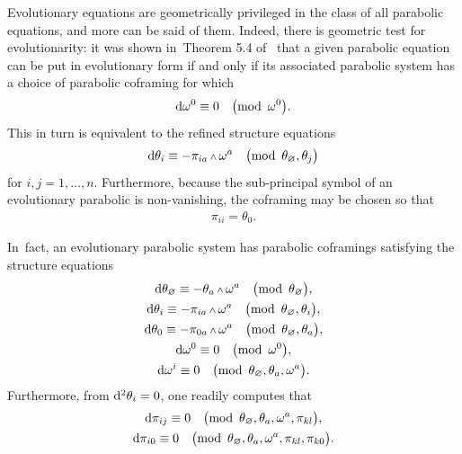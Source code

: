 \documentclass[10pt,a4paper]{amsart}
\renewcommand{\d}{{\rm d}}
\renewcommand{\mod}[1]{\quad\big(\mathrm{mod\enspace} #1\big)}
\newcommand{\w}{{\mathchoice{\,{\scriptstyle\wedge}\,}{{\scriptstyle\wedge}}
 {{\scriptscriptstyle\wedge}}{{\scriptscriptstyle\wedge}}}}
\newcommand{\thetas}[1]{\theta_{#1}}
\newcommand{\pis}[1]{\pi_{#1}}
\numberwithin{equation}{section}
\begin{document}
Evolutionary equations are geometrically privileged in the class of all parabolic equations, and more can be said of them.
Indeed, there is geometric test for evolutionarity: it was shown in~Theorem 5.4 of~\cite{McMillan:ParabolicsI} that
a given parabolic equation can be put in evolutionary form if and only if its associated parabolic system has a choice of parabolic coframing for which
\begin{gather*}
\d \omega^0 \equiv 0 \mod{\omega^0} .
\end{gather*}
This in turn is equivalent to the refined structure equations
\begin{gather}\label{eq:refined evolutionary structure equations}
 \d\thetas{i} \equiv -\pis{ia}\w\omega^a \mod{ \thetas{\varnothing},\thetas{j} }
\end{gather}
for $i, j = 1 , \dots , n$.
Furthermore, because the sub-principal symbol of an evolutionary parabolic is non-vanishing, the coframing may be chosen so that
\begin{gather}\label{eq:evolutionary parabolic sub-principal symbol}
 \pis{ii} = \thetas{0} .
\end{gather}

In~fact, an evolutionary parabolic system has parabolic coframings satisfying the structure equations
\begin{gather*}%
 \d\thetas{\varnothing} \equiv - \thetas{a}\w\omega^a \mod{\thetas{\varnothing} }, \\
 \d\thetas{i} \equiv - \pis{ia}\w\omega^a \mod{ \thetas{\varnothing}, \thetas{i} }, \\
 \d\thetas{0} \equiv - \pis{0a}\w\omega^a \mod{ \thetas{\varnothing}, \thetas{a} }, \\
 \d\omega^0 \equiv 0 \mod{\omega^0 }, \\
 \d\omega^i \equiv 0 \mod{\thetas{\varnothing}, \thetas{a}, \omega^a } .
\end{gather*}
Furthermore, from $\d^2 \thetas{i} = 0$, one readily computes that
\begin{gather*}%
 \d\pis{ij} \equiv 0 \mod{ \thetas{\varnothing}, \thetas{a}, \omega^a, \pis{kl} },
 \\
 \d\pis{i0} \equiv 0 \mod{ \thetas{\varnothing}, \thetas{a}, \omega^a, \pis{kl}, \pis{k0} } .
\end{gather*}
\end{document}
